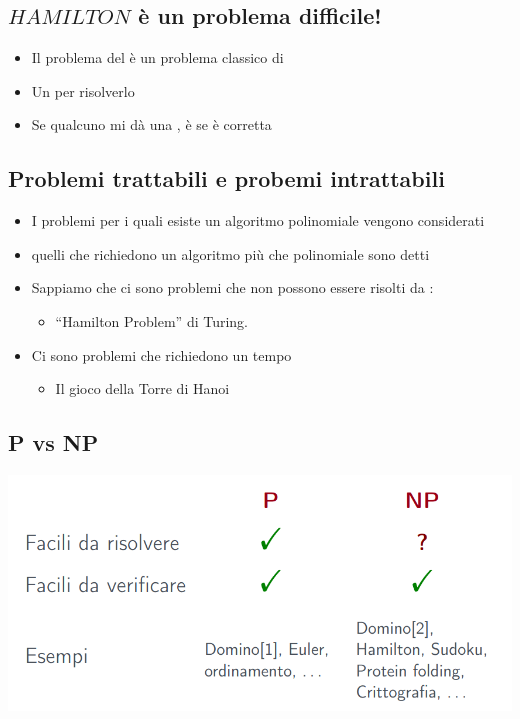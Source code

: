 \subsection{$HAMILTON$ è un problema difficile!}
\begin{itemize}
  \item Il problema del  è un problema classico di 
  \item Un  per risolverlo 
  \item Se qualcuno mi dà una , è  
    se è corretta
\end{itemize}
\subsection{Problemi trattabili e probemi intrattabili}
\begin{itemize}
  \item I problemi per i quali esiste un algoritmo polinomiale vengono considerati
  \item quelli che richiedono un algoritmo più che polinomiale sono detti 
  \item Sappiamo che ci sono problemi che non possono essere risolti da :
    \begin{itemize}
      \item ``Hamilton Problem'' di Turing.
    \end{itemize}
  \item Ci sono problemi che richiedono un tempo 
    \begin{itemize}
      \item Il gioco della Torre di Hanoi
    \end{itemize}
\end{itemize}
\begin{center}
\end{center}
\subsection{P vs NP}
\includegraphics[scale=0.5]{img/pvsnp.png}

